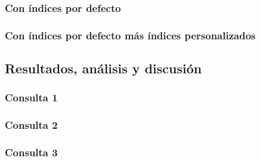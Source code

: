 \subsubsection{Con índices por defecto}

\subsubsection{Con índices por defecto más índices personalizados}

\subsection{Resultados, análisis y discusión}
\subsubsection{Consulta 1}
\subsubsection{Consulta 2}
\subsubsection{Consulta 3}
